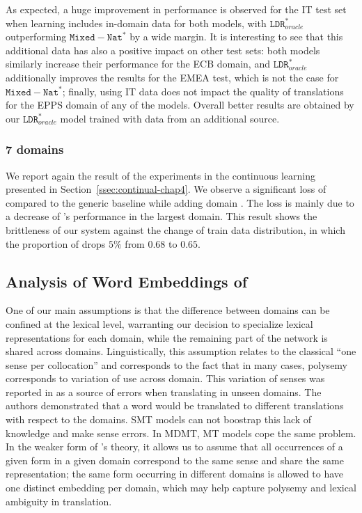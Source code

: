 As expected, a huge improvement in performance is observed for the IT test set when learning includes in-domain data for both models, with $\mathtt{LDR}_{oracle}^*$ outperforming $\mathtt{Mixed-Nat}^*$ by a wide margin.
%
It is interesting to see that this additional data has also a positive impact on other test sets: both models similarly increase their performance for the ECB domain, and $\mathtt{LDR}_{oracle}^*$ additionally improves the results for the EMEA test, which is not the case for $\mathtt{Mixed-Nat}^*$;
finally, using IT data does not impact the quality of translations for the EPPS domain of any of the models. Overall better results are obtained by our $\mathtt{LDR}_{oracle}^*$ model trained with data from an additional source.

\subsubsection{7 domains}
We report again the result of the experiments in the continuous learning presented in Section~\ref{ssec:continual-chap4}. We observe a significant loss of  compared to the generic baseline  while adding domain . The loss is mainly due to a decrease of 's performance in the largest  domain. This result shows the brittleness of our system against the change of train data distribution, in which the proportion of  drops $5\%$ from $0.68$ to $0.65$.

\subsection{Analysis of Word Embeddings of  \label{ssec:word_embeddings-chap5}}
One of our main assumptions is that the difference between domains can be confined at the lexical level, warranting our decision to specialize lexical representations for each domain, while the remaining part of the network is shared across domains. Linguistically, this assumption relates to the classical ``one sense per collocation'' \citep{Yarowsky93onesense} and corresponds to the fact that in many cases, polysemy corresponds to variation of use across domain. This variation of senses was reported in \citet{Carpuat13domain} as a source of errors when translating in unseen domains. The authors demonstrated that a word would be translated to different translations with respect to the domains. SMT models can not boostrap this lack of knowledge and make sense errors. In MDMT, MT models cope the same problem. In the weaker form of \citep{Yarowsky93onesense}'s theory, it allows us to assume that all occurrences of a given form in a given domain correspond to the same sense and share the same representation; the same form occurring in different domains is allowed to have one distinct embedding per domain, which may help capture polysemy and lexical ambiguity in translation. 

